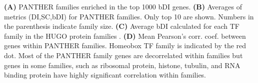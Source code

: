 \textbf{(A)} PANTHER families enriched in the top 1000 bDI genes.
\textbf{(B)} Averages of metrics (DI,SC,bDI) for PANTHER families. Only top 10 are shown. Numbers in the parenthesis indicate family size. 
\textbf{(C)} Average bDI calculated for each TF family in the HUGO protein families \citep{Gray_2014}. 
\textbf{(D)} Mean Pearson's corr. coef. between genes within PANTHER families. Homeobox TF family is indicated by the red dot. Most of the PANTHER family genes are decorrelated within families but genes in some families, such as ribosomal protein, histone, tubulin, and RNA binding protein have highly significant correlation within families. 
